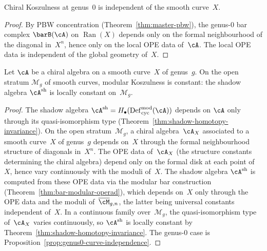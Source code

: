 \begin{proposition}
\label{prop:genus0-curve-independence}
\ClaimStatusProvedHere
{}
Chiral Koszulness at genus~$0$ is independent of the
smooth curve~$X$.
\end{proposition}

\begin{proof}
By PBW concentration (Theorem~\ref{thm:master-pbw}),
the genus-$0$ bar complex $\barB(\cA)$ on
$\operatorname{Ran}(X)$ depends only on the formal
neighbourhood of the diagonal in~$X^n$, hence only on
the local OPE data of~$\cA$.  The local OPE data is
independent of the global geometry of~$X$.
\end{proof}

\begin{theorem}
\label{thm:open-stratum-curve-independence}
\ClaimStatusProvedHere
{}
Let $\cA$ be a chiral algebra on a smooth curve~$X$
of genus~$g$.  On the open stratum
$\mathcal{M}_g$ of smooth curves, modular Koszulness
is constant: the shadow algebra
$\cA^{\mathrm{sh}}$ is locally constant
on~$\mathcal{M}_g$.
\end{theorem}

\begin{proof}
The shadow algebra
$\cA^{\mathrm{sh}} = H_\bullet(\operatorname{Def}^{\mathrm{mod}}_{\mathrm{cyc}}(\cA))$
depends on $\cA$ only through its quasi-isomorphism
type (Theorem~\ref{thm:shadow-homotopy-invariance}).
On the open stratum~$\mathcal{M}_g$, a chiral
algebra~$\cA_X$ associated to a smooth curve~$X$ of
genus~$g$ depends on~$X$ through the formal
neighbourhood structure of diagonals in~$X^n$.
The OPE data of~$\cA_X$ (the structure constants
determining the chiral algebra) depend only on the
formal disk at each point of~$X$, hence vary
continuously with the moduli of~$X$.
The shadow algebra $\cA^{\mathrm{sh}}$ is computed
from these OPE data via the modular bar construction
(Theorem~\ref{thm:bar-modular-operad}), which
depends on~$X$ only through the OPE data and the
moduli of~$\overline{\cM}_{g,n}$, the latter being
universal constants independent of~$X$.
In a continuous family over~$\mathcal{M}_g$, the
quasi-isomorphism type of~$\cA_X$ varies
continuously, so $\cA^{\mathrm{sh}}$ is locally
constant by Theorem~\ref{thm:shadow-homotopy-invariance}.
The genus-$0$ case is
Proposition~\ref{prop:genus0-curve-independence}.
\end{proof}

